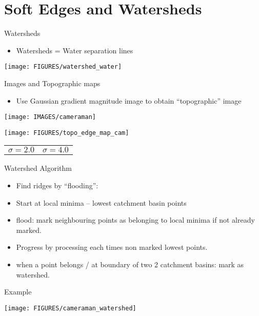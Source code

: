 \documentclass[9pt]{beamer}
\begin{document}
\section{Soft Edges and Watersheds}
\label{sec:water}


\begin{frame}{Watersheds}
  \begin{itemize}
  \item Watersheds = Water separation lines
  \end{itemize}
  \begin{center}
    \texttt{[image: FIGURES/watershed\_water]}
  \end{center}
\end{frame}


\begin{frame}{Images and Topographic maps}
  \begin{itemize}
  \item Use Gaussian gradient magnitude image to obtain ``topographic'' image
  \end{itemize}
  \begin{center}
    \texttt{[image: IMAGES/cameraman]}
  \end{center}
\begin{center}
    \texttt{[image: FIGURES/topo\_edge\_map\_cam]}
    \begin{tabular}{c@{\hskip 2cm}c}
		$\sigma=2.0$&$\sigma=4.0$
  	\end{tabular}
\end{center}
\end{frame}


\begin{frame}{Watershed Algorithm}
  \begin{itemize}
  \item Find ridges by ``flooding'':
  \item Start at local minima -- lowest catchment basin points
  \item flood: mark neighbouring points as belonging to local minima if not already marked.
  \item Progress by processing each times non marked lowest points.
  \item when a point belongs / at boundary of two 2 catchment basins: mark as watershed.
  \end{itemize}
\end{frame}

\begin{frame}{Example}
  \begin{center}
    \texttt{[image: FIGURES/cameraman\_watershed]}
  \end{center}
\end{frame}
\end{document}
